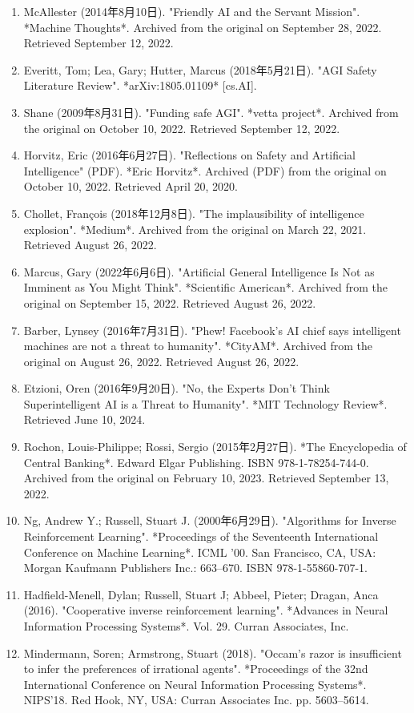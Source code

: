 \begin{enumerate}
\item McAllester (2014年8月10日). "Friendly AI and the Servant Mission". *Machine Thoughts*. Archived from the original on September 28, 2022. Retrieved September 12, 2022.
\item Everitt, Tom; Lea, Gary; Hutter, Marcus (2018年5月21日). "AGI Safety Literature Review". *arXiv:1805.01109* [cs.AI].
\item Shane (2009年8月31日). "Funding safe AGI". *vetta project*. Archived from the original on October 10, 2022. Retrieved September 12, 2022.
\item Horvitz, Eric (2016年6月27日). "Reflections on Safety and Artificial Intelligence" (PDF). *Eric Horvitz*. Archived (PDF) from the original on October 10, 2022. Retrieved April 20, 2020.
\item Chollet, François (2018年12月8日). "The implausibility of intelligence explosion". *Medium*. Archived from the original on March 22, 2021. Retrieved August 26, 2022.
\item Marcus, Gary (2022年6月6日). "Artificial General Intelligence Is Not as Imminent as You Might Think". *Scientific American*. Archived from the original on September 15, 2022. Retrieved August 26, 2022.
\item Barber, Lynsey (2016年7月31日). "Phew! Facebook's AI chief says intelligent machines are not a threat to humanity". *CityAM*. Archived from the original on August 26, 2022. Retrieved August 26, 2022.
\item Etzioni, Oren (2016年9月20日). "No, the Experts Don't Think Superintelligent AI is a Threat to Humanity". *MIT Technology Review*. Retrieved June 10, 2024.
\item Rochon, Louis-Philippe; Rossi, Sergio (2015年2月27日). *The Encyclopedia of Central Banking*. Edward Elgar Publishing. ISBN 978-1-78254-744-0. Archived from the original on February 10, 2023. Retrieved September 13, 2022.
\item Ng, Andrew Y.; Russell, Stuart J. (2000年6月29日). "Algorithms for Inverse Reinforcement Learning". *Proceedings of the Seventeenth International Conference on Machine Learning*. ICML '00. San Francisco, CA, USA: Morgan Kaufmann Publishers Inc.: 663–670. ISBN 978-1-55860-707-1.
\item Hadfield-Menell, Dylan; Russell, Stuart J; Abbeel, Pieter; Dragan, Anca (2016). "Cooperative inverse reinforcement learning". *Advances in Neural Information Processing Systems*. Vol. 29. Curran Associates, Inc.
\item Mindermann, Soren; Armstrong, Stuart (2018). "Occam's razor is insufficient to infer the preferences of irrational agents". *Proceedings of the 32nd International Conference on Neural Information Processing Systems*. NIPS'18. Red Hook, NY, USA: Curran Associates Inc. pp. 5603–5614.

\end{enumerate}
